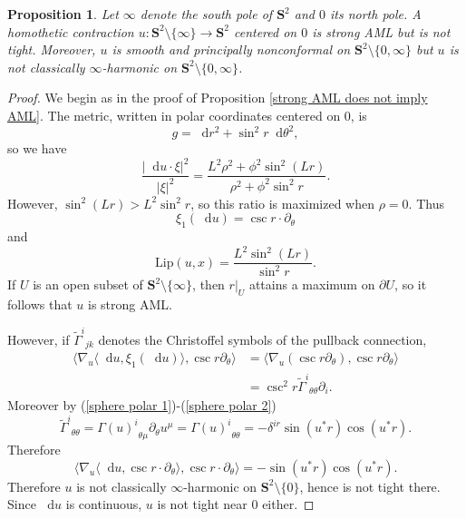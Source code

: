 \documentclass[reqno,11pt]{amsart}
\newcommand{\Sph}{\mathbf S}
\newcommand*\dif{\mathop{}\!\mathrm{d}}
\newcommand{\Lip}{\mathrm{Lip}}
\newtheorem{proposition}[theorem]{Proposition}
\theoremstyle{definition}
\numberwithin{equation}{section}
\begin{document}
\begin{proposition}
Let $\infty$ denote the south pole of $\Sph^2$ and $0$ its north pole. 
A homothetic contraction $u: \Sph^2 \setminus \{\infty\} \to \Sph^2$ centered on $0$ is strong AML but is not tight.
Moreover, $u$ is smooth and principally nonconformal on $\Sph^2 \setminus \{0, \infty\}$ but $u$ is not classically $\infty$-harmonic on $\Sph^2 \setminus \{0, \infty\}$.
\end{proposition}
\begin{proof}
We begin as in the proof of Proposition \ref{strong AML does not imply AML}.
The metric, written in polar coordinates centered on $0$, is 
$$g = \dif r^2 + \sin^2 r \dif \theta^2,$$
so we have 
$$\frac{|\dif u \cdot \xi|^2}{|\xi|^2} = \frac{L^2 \rho^2 + \phi^2 \sin^2(Lr)}{\rho^2 + \phi^2 \sin^2 r}.$$
However, $\sin^2 (Lr) > L^2 \sin^2 r$, so this ratio is maximized when $\rho = 0$.
Thus
$$\xi_1(\dif u) = \csc r \cdot \partial_\theta$$
and
$$\Lip(u, x) = \frac{L^2 \sin^2 (Lr)}{\sin^2 r}.$$
If $U$ is an open subset of $\Sph^2 \setminus \{\infty\}$, then $r|_U$ attains a maximum on $\partial U$, so it follows that $u$ is strong AML.

However, if ${\tilde \Gamma^i}_{jk}$ denotes the Christoffel symbols of the pullback connection,
\begin{align*}
\langle \nabla_u \langle \dif u, \xi_1(\dif u)\rangle, \csc r \partial_\theta\rangle 
&= \langle \nabla_u(\csc r \partial_\theta), \csc r \partial_\theta\rangle \\
&= \csc^2 r {\tilde \Gamma^i}_{\theta \theta} \partial_i.
\end{align*}
Moreover by (\ref{sphere polar 1})-(\ref{sphere polar 2})
$${\tilde \Gamma^i}_{\theta \theta} = {\Gamma(u)^i}_{\theta \mu} \partial_\theta u^\mu = {\Gamma(u)^i}_{\theta \theta} = -\delta^{ir} \sin(u^*r) \cos(u^* r).$$
Therefore
$$\langle \nabla_u \langle \dif u, \csc r \cdot \partial_\theta\rangle, \csc r \cdot \partial_\theta\rangle = -\sin(u^* r) \cos(u^* r).$$
Therefore $u$ is not classically $\infty$-harmonic on $\Sph^2 \setminus \{0\}$, hence is not tight there.
Since $\dif u$ is continuous, $u$ is not tight near $0$ either.
\end{proof}
\end{document}
